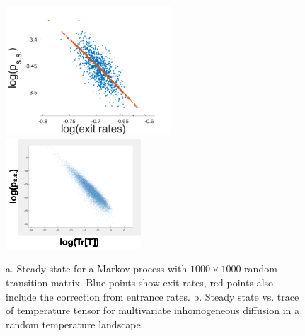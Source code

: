 \documentclass[reprint,prx]{revtex4-1}
\renewcommand{\=}[1]{\stackrel{#1}{=}} %
\renewcommand{\(}{\left (}
\renewcommand{\)}{\right  )}
\renewcommand{\[}{\left [}
\renewcommand{\]}{\right ]}
\newcommand{\<}{\left <}
\renewcommand{\>}{\right >}
\theoremstyle{definition}
\theoremstyle{remark}
\begin{document}
\begin{figure}
	\includegraphics[width=0.55\textwidth]{randMark.pdf}
	\includegraphics[width=0.45\textwidth]{randDiff.png}
	\caption{a. Steady state for a Markov process with $ 1000 \times 1000 $ random transition matrix. Blue points show exit rates, red points also include the correction from entrance rates.
	b. Steady state vs. trace of temperature tensor for multivariate inhomogeneous diffusion in a random temperature landscape}
	\label{fig:randDynamics}
\end{figure}
\end{document}
